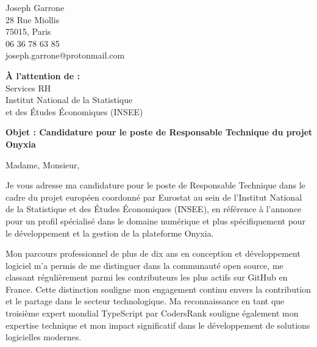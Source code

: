\documentclass[10.5pt,a4paper]{article}
\begin{document}
\begin{flushleft}
Joseph Garrone\\
28 Rue Miollis\\
75015, Paris\\
06 36 78 63 85\\
joseph.garrone@protonmail.com\\
\end{flushleft}

\begin{flushright}
\textbf{À l'attention de :}\\
Services RH\\
Institut National de la Statistique\\
et des Études Économiques (INSEE)\\
\end{flushright}

\vspace{2em}

\begin{center}
\textbf{Objet : Candidature pour le poste de Responsable Technique du projet Onyxia}
\end{center}

\vspace{2em}

Madame, Monsieur,

\vspace{1em}

Je vous adresse ma candidature pour le poste de Responsable Technique dans le cadre du projet européen coordonné par Eurostat au sein de l'Institut National de la Statistique et des Études Économiques (INSEE), en référence à l'annonce pour un profil spécialisé dans le domaine numérique et plus spécifiquement pour le développement et la gestion de la plateforme Onyxia.

\vspace{1em}

Mon parcours professionnel de plus de dix ans en conception et développement logiciel m'a permis de me distinguer dans la communauté open source, me classant régulièrement parmi les contributeurs les plus actifs sur GitHub en France. Cette distinction souligne mon engagement continu envers la contribution et le partage dans le secteur technologique. Ma reconnaissance en tant que troisième expert mondial TypeScript par CodersRank souligne également mon expertise technique et mon impact significatif dans le développement de solutions logicielles modernes.

\vspace{1em}
\end{document}
